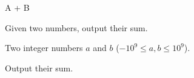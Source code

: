 \begin{problem}{A + B}

Given two numbers, output their sum.

\InputFile

Two integer numbers $a$ and $b$ ($-10^9 \le a, b \le 10^9$).

\OutputFile

Output their sum.

\end{problem}
